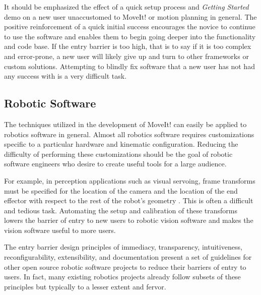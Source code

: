 \documentclass[10pt,journal,compsoc]{joser1}
\begin{document}
{It should be emphasized the effect of a quick setup process and \textit{Getting Started} demo on a new user unaccustomed to MoveIt! or motion planning in general. The positive reinforcement of a quick initial success encourages the novice to continue to use the software and enables them to begin going deeper into the functionality and code base. If the entry barrier is too high, that is to say if it is too complex and error-prone, a new user will likely give up and turn to other frameworks or custom solutions. Attempting to blindly fix software that a new user has not had any success with is a very difficult task.

\subsection{Robotic Software}
\label{sec::robotic_discussion}

The techniques utilized in the development of MoveIt! can easily be applied to robotics software in general. Almost all robotics software requires customizations specific to a particular hardware and kinematic configuration. Reducing the difficulty of performing these customizations should be the goal of robotic software engineers who desire to create useful tools for a large audience. 

For example, in perception applications such as visual servoing, frame transforms must be specified for the location of the camera and the location of the end effector with respect to the rest of the robot's geometry \cite{visual_servoing}. This is often a difficult and tedious task. Automating the setup and calibration of these transforms lowers the barrier of entry to new users to robotic vision software and makes the vision software useful to more users.

The entry barrier design principles of immediacy, transparency, intuitiveness, reconfigurability, extensibility, and documentation present a set of guidelines for other open source robotic software projects to reduce their barriers of entry to users. In fact, many existing robotics projects already follow subsets of these principles but typically to a lesser extent and fervor.

}
\end{document}
